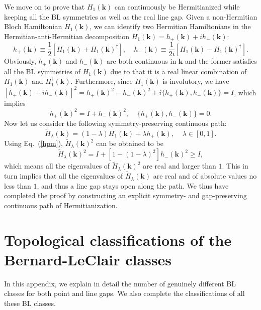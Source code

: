 \documentclass{tADP2e}
\theoremstyle{plain}
\theoremstyle{plain}
\theoremstyle{definition}
\begin{document}
\begin{appendices}
We move on to prove that $H_1(\boldsymbol{k})$ can continuously be Hermitianized while keeping all the BL symmetries as well as the real line gap. Given a non-Hermitian Bloch Hamiltonian $H_1(\boldsymbol{k})$, we can identify two Hermitian Hamiltonians in the Hermitian-anti-Hermitian decomposition $H_1(\boldsymbol{k})=h_+(\boldsymbol{k})+ih_-(\boldsymbol{k})$:
\begin{equation}
h_+(\boldsymbol{k})\equiv \frac{1}{2}[H_1(\boldsymbol{k})+H_1(\boldsymbol{k})^\dag],\;\;\;\;
h_-(\boldsymbol{k})\equiv \frac{1}{2i}[H_1(\boldsymbol{k})-H_1(\boldsymbol{k})^\dag].
\end{equation}
Obviously, $h_+(\boldsymbol{k})$ and $h_-(\boldsymbol{k})$ are both continuous in $\boldsymbol{k}$ and the former satisfies all the BL symmetries of $H_1(\boldsymbol{k})$ due to that it is a real linear combination of $H_1(\boldsymbol{k})$ and $H^\dag_1(\boldsymbol{k})$. Furthermore, since $H_1(\boldsymbol{k})$ is involutory, we have
$[h_+(\boldsymbol{k})+ih_-(\boldsymbol{k})]^2=h_+(\boldsymbol{k})^2-h_-(\boldsymbol{k})^2+i\{h_+(\boldsymbol{k}),h_-(\boldsymbol{k})\}=I$,
which implies
\begin{equation}
h_+(\boldsymbol{k})^2=I+h_-(\boldsymbol{k})^2,\;\;\;\;\{h_+(\boldsymbol{k}),h_-(\boldsymbol{k})\}=0.
\label{hpm}
\end{equation}
Now let us consider the following symmetry-preserving continuous path:
\begin{equation}
\tilde H_\lambda(\boldsymbol{k})=(1-\lambda)H_1(\boldsymbol{k})+\lambda h_+(\boldsymbol{k}),\;\;\;\;
\lambda\in[0,1].
\end{equation}
Using Eq.~(\ref{hpm}), $\tilde H_\lambda(\boldsymbol{k})^2$ can be obtained to be
\begin{equation}
\tilde H_\lambda(\boldsymbol{k})^2=I+[1-(1-\lambda)^2]h_-(\boldsymbol{k})^2\ge I,
\end{equation}
which means all the eigenvalues of $\tilde H_\lambda(\boldsymbol{k})^2$ are real and larger than $1$. This in turn implies that all the eigenvalues of $\tilde H_\lambda(\boldsymbol{k})$ are real and of absolute values no less than $1$, and thus a line gap stays open along the path.  We thus have completed the proof by constructing an explicit symmetry- and gap-preserving continuous path of Hermitianization.



\section{Topological classifications of the Bernard-LeClair classes}\label{app5}
In this appendix, we explain in detail the number of genuinely different BL classes for both point and line gaps. We also complete the classifications of all these BL classes. %


\end{appendices}
\end{document}

